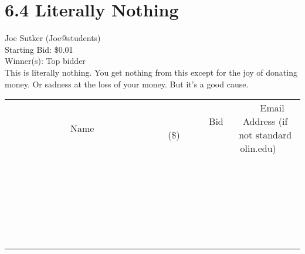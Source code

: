\documentclass[11pt]{article}
\begin{document}
\section*{6.4 Literally Nothing}
Joe Sutker (Joe@students) \\
Starting Bid: \$0.01 \\
Winner(s): 
Top bidder \\
This is literally nothing. You get nothing from this except for the joy of donating money. Or sadness at the loss of your money. But it's a good cause. \\[6ex]
\begin{tabular}{c c c}
~~~~~~~~~~~~~Name~~~~~~~~~~~~~ & ~~~~~~~~~Bid (\$)~~~~~~~~~ & ~~~Email Address (if not standard olin.edu)~~~ \\
 & & \\
\hline
 & & \\
\hline
 & & \\
\hline
 & & \\
\hline
 & & \\
\hline
 & & \\
\hline
 & & \\
\hline
 & & \\
\hline
 & & \\
\hline
 & & \\
\hline
 & & \\
\hline
 & & \\
\hline
 & & \\
\hline
 & & \\
\hline
 & & \\
\hline
 & & \\
\hline
 & & \\
\hline
 & & \\
\hline
 & & \\
\hline
 & & \\
\hline
 & & \\
\hline
 & & \\
\hline
 & & \\
\hline
 & & \\
\hline
 & & \\
\hline
 & & \\
\hline
\end{tabular}
\clearpage
\end{document}
